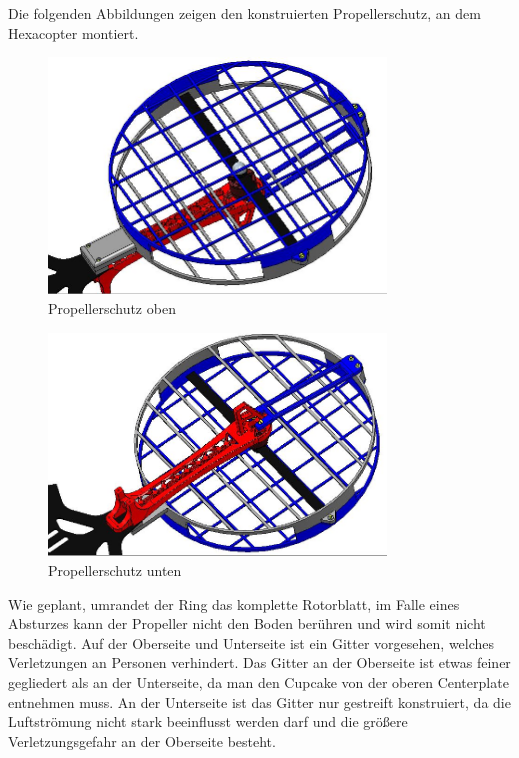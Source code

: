 	Die folgenden Abbildungen zeigen den konstruierten Propellerschutz, an dem Hexacopter montiert.

			\begin{figure}[tbh]
			\begin{centering}
			\includegraphics[width = 0.8\textwidth]{Bilder/propellerschutz_gesamt_oben}
			\par\end{centering}
			\caption{Propellerschutz oben}
			\label{propellerschutz_gesamt_oben}
			\end{figure}

			\begin{figure}[H]
			\begin{centering}
			\includegraphics[width = 0.8\textwidth]{Bilder/propellerschutz_gesamt_unten}
			\par\end{centering}
			\caption{Propellerschutz unten}
			\label{propellerschutz_gesamt_unten}
			\end{figure}

	Wie geplant, umrandet der Ring das komplette Rotorblatt, im Falle eines Absturzes kann der Propeller nicht den Boden berühren und wird somit nicht beschädigt.
	Auf der Oberseite und Unterseite ist ein Gitter vorgesehen, welches Verletzungen an Personen verhindert.
	Das Gitter an der Oberseite ist etwas feiner gegliedert als an der Unterseite, da man den Cupcake von der oberen Centerplate entnehmen muss.
	An der Unterseite ist das Gitter nur gestreift konstruiert, da die Luftströmung nicht stark beeinflusst werden darf und die größere Verletzungsgefahr an der Oberseite besteht.

